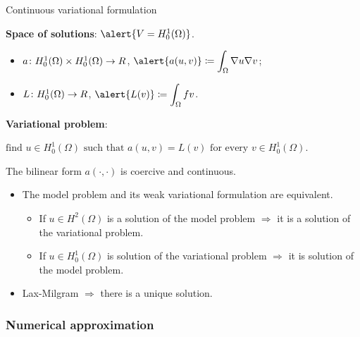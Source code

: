 \begin{frame}[allowframebreaks]{Continuous variational formulation}

\textbf{Space of solutions}: $\alert{V=H_0^1(\Omega)}$.
\begin{itemize}\itemsep1em
	\item $a\colon H^1_0(\Omega)\times H_0^1(\Omega)\to\relax R$, $\displaystyle \alert{a(u,v)}\coloneqq\int_\Omega\nabla u\nabla v$;
	\item $L\colon H_0^1(\Omega)\to\relax R$, $\displaystyle \alert{L(v)}\coloneqq\int_\Omega f v$.
\end{itemize}
\textbf{Variational problem}:
\begin{block}{}
	\begin{center}
	$\text{find } u\in H^1_0(\Omega) \text{ such that } a(u,v)=L(v)\text{ for every } v\in H_0^1(\Omega)$.
	\end{center}
\end{block}
\framebreak
\begin{theorem}
	The bilinear form $a(\cdot,\cdot)$ is coercive and continuous.
\end{theorem}

\begin{itemize}\itemsep1em
	\item The model problem and its weak variational formulation are \alert{equivalent}.
	\begin{itemize}\itemsep1em
		\item If $u\in H^2(\Omega)$ is a solution of the model problem $\Rightarrow$ it is a solution of the variational problem.
		\item If $u\in H_0^1(\Omega)$ is solution of the variational problem $\Rightarrow$ it is solution of the model problem.
	\end{itemize}
	\item \alert{Lax-Milgram} $\Rightarrow$ there is a unique solution.
\end{itemize}

\end{frame}

\subsubsection{Numerical approximation}

